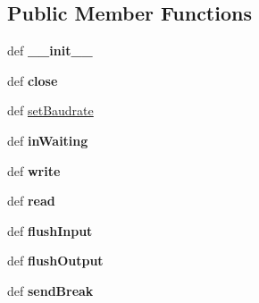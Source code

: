 \subsection*{Public Member Functions}
\begin{DoxyCompactItemize}
\item 
\hypertarget{classserial_1_1serialjava_1_1_serial_ac4dfc29fc258e1d5e9ceefde89c74bd5}{def {\bfseries \-\_\-\-\_\-init\-\_\-\-\_\-}}\label{classserial_1_1serialjava_1_1_serial_ac4dfc29fc258e1d5e9ceefde89c74bd5}

\item 
\hypertarget{classserial_1_1serialjava_1_1_serial_ac7e556413ed75760aa94e3cca1527a20}{def {\bfseries close}}\label{classserial_1_1serialjava_1_1_serial_ac7e556413ed75760aa94e3cca1527a20}

\item 
def \hyperlink{classserial_1_1serialjava_1_1_serial_a84bb91d0f817d6836a8663c816d16c20}{set\-Baudrate}
\item 
\hypertarget{classserial_1_1serialjava_1_1_serial_abab9fdcfd72dab8510f2f23acdeab604}{def {\bfseries in\-Waiting}}\label{classserial_1_1serialjava_1_1_serial_abab9fdcfd72dab8510f2f23acdeab604}

\item 
\hypertarget{classserial_1_1serialjava_1_1_serial_ac449aeafdaa62aeda707ed5560d36b29}{def {\bfseries write}}\label{classserial_1_1serialjava_1_1_serial_ac449aeafdaa62aeda707ed5560d36b29}

\item 
\hypertarget{classserial_1_1serialjava_1_1_serial_ae71c04f73bab6ee003a8715d82766990}{def {\bfseries read}}\label{classserial_1_1serialjava_1_1_serial_ae71c04f73bab6ee003a8715d82766990}

\item 
\hypertarget{classserial_1_1serialjava_1_1_serial_a8dc207e20ff59b4805fc1f81276a8a29}{def {\bfseries flush\-Input}}\label{classserial_1_1serialjava_1_1_serial_a8dc207e20ff59b4805fc1f81276a8a29}

\item 
\hypertarget{classserial_1_1serialjava_1_1_serial_a53d55c5e44953db4219d1eea4535aa81}{def {\bfseries flush\-Output}}\label{classserial_1_1serialjava_1_1_serial_a53d55c5e44953db4219d1eea4535aa81}

\item 
\hypertarget{classserial_1_1serialjava_1_1_serial_ab5e0414b7092ed2f23898de8b3c49a09}{def {\bfseries send\-Break}}\label{classserial_1_1serialjava_1_1_serial_ab5e0414b7092ed2f23898de8b3c49a09}


\end{DoxyCompactItemize}
